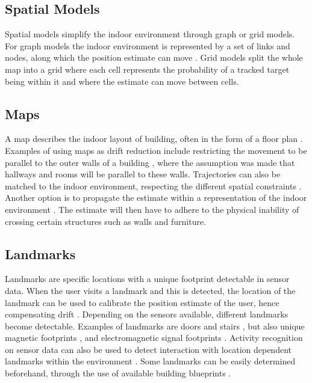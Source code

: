 \subsection{Spatial Models}

Spatial models simplify the indoor environment through graph or grid models. For graph models the indoor environment is represented by a set of links and nodes, along which the position estimate can move \cite{Davidson2017,Jackermeier2018}. Grid models split the whole map into a grid where each cell represents the probability of a tracked target being within it \cite{Gu2019} and where the estimate can move between cells.\par 

\subsection{Maps}

A map describes the indoor layout of building, often in the form of a floor plan \cite{Gu2019}. Examples of using maps as drift reduction include restricting the movement to be parallel to the outer walls of a building \cite{Abdulrahim2011}, where the assumption was made that hallways and rooms will be parallel to these walls. Trajectories can also be matched to  the indoor environment, respecting the different spatial constraints \cite{Gu2019}. Another option is to propagate the estimate within a representation of the indoor environment \cite{Qian2015}. The estimate will then have to adhere to the physical inability of crossing certain structures such as walls and furniture.\par

\subsection{Landmarks}

Landmarks are specific locations with a unique footprint detectable in sensor data. When the user visits a landmark and this is detected, the location of the landmark can be used to calibrate the position estimate of the user, hence compensating drift \cite{Diaz2017}. Depending on the sensors available, different landmarks become detectable. Examples of landmarks are doors and stairs \cite{Diaz2017,Gu2019,Torok2014}, but also unique magnetic footprints \cite{MunozDiaz2019}, and electromagnetic signal footprints \cite{Gu2019}. Activity recognition on sensor data can also be used to detect interaction with location dependent landmarks within the environment \cite{Hardegger2012, Hardegger2016}.  Some landmarks can be easily determined beforehand, through the use of available building blueprints \cite{Gu2019}. 

